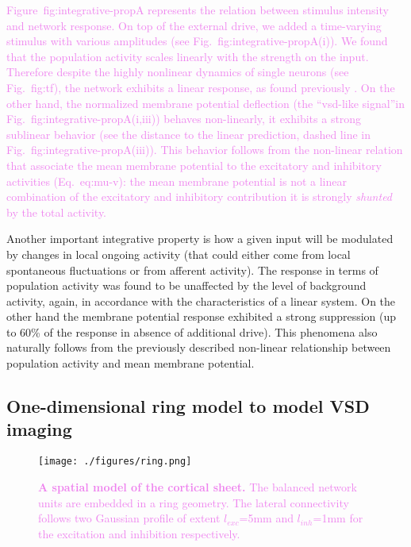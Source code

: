 \documentclass[8pt, colorlinks, a4paper]{article}
\renewcommand\ref{}
\newcommand{\corr}[1]{{\textcolor{violet}{#1}}}
\begin{document}
\corr{Figure~\ref{fig:integrative-prop}A represents the relation
  between stimulus intensity and network response.  On top of the
  external drive, we added a time-varying stimulus with various
  amplitudes (see Fig.~\ref{fig:integrative-prop}A(i)). We found that
  the population activity scales linearly with the strength on the
  input. Therefore despite the highly nonlinear dynamics of single
  neurons (see Fig.~\ref{fig:tf}), the network exhibits a linear
  response, as found previously \cite{VanVreeswijk1996}. On the other
  hand, the normalized membrane potential deflection (the ``vsd-like
  signal''in Fig.~\ref{fig:integrative-prop}A(i,iii)) behaves
  non-linearly, it exhibits a strong sublinear behavior (see the
  distance to the linear prediction, dashed line in
  Fig.~\ref{fig:integrative-prop}A(iii)).  This behavior follows from
  the non-linear relation that associate the mean membrane potential
  to the excitatory and inhibitory activities (Eq.~\ref{eq:mu-v}): the
  mean membrane potential is not a linear combination of the
  excitatory and inhibitory contribution it is strongly \emph{shunted}
  by the total activity.}

Another important integrative property is how a given input will be
modulated by changes in local ongoing activity (that could either come
from local spontaneous fluctuations or from afferent activity).  The
response in terms of population activity was found to be unaffected by
the level of background activity, again, in accordance with the
characteristics of a linear system. On the other hand the membrane
potential response exhibited a strong suppression (up to 60\% of the
response in absence of additional drive). This phenomena also
naturally follows from the previously described non-linear
relationship between population activity and mean membrane potential.


\subsection{One-dimensional ring model to model VSD imaging}
\label{sec-4-8}

\begin{figure}[tb!]
\centering
\texttt{[image: ./figures/ring.png]}

\caption{\label{fig:ring}\corr{\textbf{A spatial model of the cortical
      sheet.} The balanced network units are embedded in a ring
    geometry. The lateral connectivity follows two Gaussian profile of
    extent \(l_{exc}\)=5mm and \(l_{inh}\)=1mm for the excitation and
    inhibition respectively.}}

\end{figure}
\end{document}
